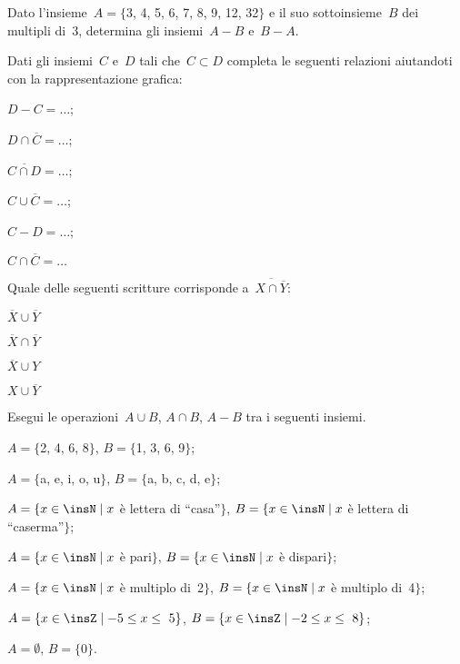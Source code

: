 \begin{esercizio}
\label{ese:\thechapter.103}
Dato l'insieme~$A=\{$3, 4, 5, 6, 7, 8, 9, 12, 32$\}$ e il suo sottoinsieme~$B$ dei multipli di~3, determina gli
insiemi~$A-B$ e~$B-A$.
\end{esercizio}

\begin{esercizio}
\label{ese:\thechapter.104}
Dati gli insiemi~$C$ e~$D$ tali che~$C\subset D$
completa le seguenti relazioni aiutandoti con la rappresentazione
grafica:
\begin{multicols}{3}
\begin{enumeratea}
\item $D-C=\ldots$;
\item $D\cap \overline{C}=\ldots$;
\item $\overline{C\cap D}=\ldots$;
\item $C\cup \overline{C}=\ldots$;
\item $C-D=\ldots$;
\item $C\cap \overline{C}=\ldots$
\end{enumeratea}
\end{multicols}
\end{esercizio}

\begin{esercizio}
\label{ese:\thechapter.105}
Quale delle seguenti scritture corrisponde a~$\overline{{X\cap \overline{Y}}}$:
\begin{multicols}{4}
 \begin{enumeratea}
 \item $\overline{X}\cup \overline{Y}$
 \item $\overline{X}\cap \overline{Y}$
 \item $\overline{X}\cup Y$
 \item $X\cup \overline{Y}$
 \end{enumeratea}
\end{multicols}
\end{esercizio}

\begin{esercizio}
\label{ese:\thechapter.106}
Esegui le operazioni~$A\cup B$, $A\cap B$, $A-B$ tra i seguenti insiemi.

\begin{enumeratea}
\item $A=\{$2, 4, 6, 8$\}$, $B=\{$1, 3, 6, 9$\}$;
\item $A=\{$a, e, i, o, u$\}$, $B=\{$a, b, c, d, e$\}$;
\item $A=\{x\in\insN\mid x$ è lettera di ``casa''$\}$, $B=\{x\in\insN\mid x$ è lettera di ``caserma''$\}$;
\item $A=\{x\in\insN\mid x$ è pari$\}$, $B=\{x\in\insN\mid x$ è dispari$\}$;
\item $A=\{x\in\insN\mid x$ è multiplo di~2$\}$, $B=\{x\in\insN\mid x$ è multiplo di~4$\}$;
\item $A=\{x\in\insZ\mid -5\le x\le~5\}$, $B=\{x\in\insZ\mid -2\le x\le~8\}$;
\item $A=\emptyset$, $B=\{0\}$.
\end{enumeratea}
\end{esercizio}

